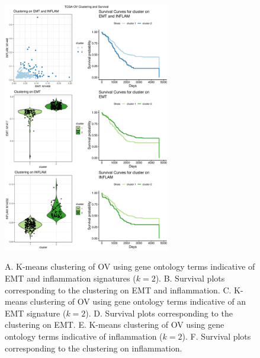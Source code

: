\documentclass[11pt]{article}
\begin{document}
\begin{figure}
\center
{\includegraphics[width=0.65\textwidth]{Figure6/OV.pdf}}
\caption{A. K-means clustering of OV using gene ontology terms indicative of EMT and inflammation signatures ($k=2$).
B. Survival plots corresponding to the clustering on EMT and inflammation.
C. K-means clustering of OV using gene ontology terms indicative of an EMT signature ($k=2$).
D. Survival plots corresponding to the clustering on EMT.
E. K-means clustering of OV using gene ontology terms indicative of inflammation ($k=2$).
F. Survival plots corresponding to the clustering on inflammation.}
\label{fig:OV}
\end{figure}

\end{document}
